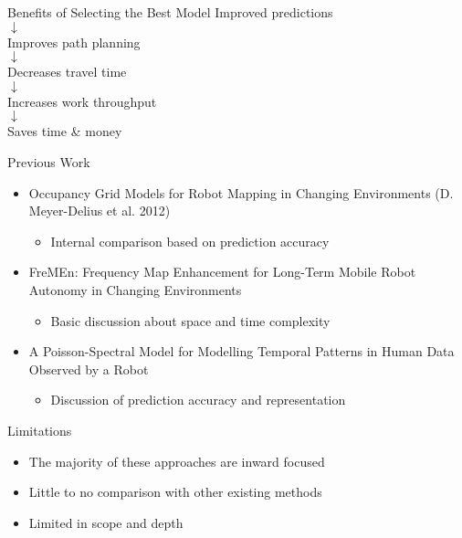 \documentclass{beamer}
\begin{document}
\begin{frame}{Benefits of Selecting the Best Model}
  \centering
    Improved predictions
    \\
    $\downarrow$
    \\
    Improves path planning
    \\
    $\downarrow$
    \\
    Decreases travel time
    \\
    $\downarrow$
    \\
    Increases work throughput
    \\
    $\downarrow$
    \\
    Saves time \& money
    \\
\end{frame}


\begin{frame}[t]{Previous Work}

  \begin{itemize}
    \item \scriptsize Occupancy Grid Models for Robot Mapping in Changing Environments (D. Meyer-Delius et al. 2012) \cite{Meyer-Delius2012} \normalsize
    \begin{itemize}
      \item Internal comparison based on prediction accuracy
    \end{itemize}

    \item \scriptsize FreMEn: Frequency Map Enhancement for Long-Term Mobile Robot Autonomy in Changing Environments \cite{krajnik2015} \normalsize
    \begin{itemize}
      \item Basic discussion about space and time complexity
    \end{itemize}

  \item \scriptsize A Poisson-Spectral Model for Modelling Temporal Patterns in Human Data Observed by a Robot \cite{Jovan2016} \normalsize
    \begin{itemize}
      \item Discussion of prediction accuracy and representation
    \end{itemize}
  \end{itemize}

  \begin{block}{Limitations}
    \begin{itemize}
      \item The majority of these approaches are inward focused
      \item Little to no comparison with other existing methods
      \item Limited in scope and depth
    \end{itemize}
  \end{block}

\end{frame}
\end{document}
